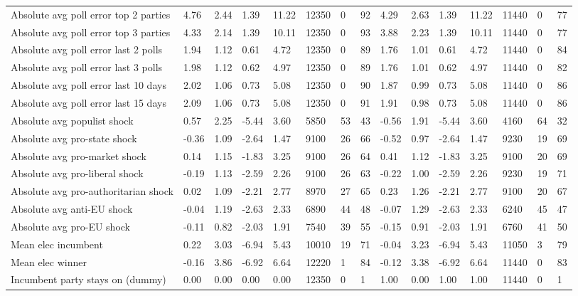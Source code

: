 \begin{longtable}{lllllllllllllll}
Absolute avg poll error top 2 parties & 4.76 & 2.44 & 1.39 & 11.22 & 12350 & 0 & 92 & 4.29 & 2.63 & 1.39 & 11.22 & 11440 & 0 & 77\\
Absolute avg poll error top 3 parties & 4.33 & 2.14 & 1.39 & 10.11 & 12350 & 0 & 93 & 3.88 & 2.23 & 1.39 & 10.11 & 11440 & 0 & 77\\
Absolute avg poll error last 2 polls & 1.94 & 1.12 & 0.61 & 4.72 & 12350 & 0 & 89 & 1.76 & 1.01 & 0.61 & 4.72 & 11440 & 0 & 84\\
\addlinespace
Absolute avg poll error last 3 polls & 1.98 & 1.12 & 0.62 & 4.97 & 12350 & 0 & 89 & 1.76 & 1.01 & 0.62 & 4.97 & 11440 & 0 & 82\\
Absolute avg poll error last 10 days & 2.02 & 1.06 & 0.73 & 5.08 & 12350 & 0 & 90 & 1.87 & 0.99 & 0.73 & 5.08 & 11440 & 0 & 86\\
Absolute avg poll error last 15 days & 2.09 & 1.06 & 0.73 & 5.08 & 12350 & 0 & 91 & 1.91 & 0.98 & 0.73 & 5.08 & 11440 & 0 & 86\\
Absolute avg populist shock & 0.57 & 2.25 & -5.44 & 3.60 & 5850 & 53 & 43 & -0.56 & 1.91 & -5.44 & 3.60 & 4160 & 64 & 32\\
Absolute avg pro-state shock & -0.36 & 1.09 & -2.64 & 1.47 & 9100 & 26 & 66 & -0.52 & 0.97 & -2.64 & 1.47 & 9230 & 19 & 69\\
\addlinespace
Absolute avg pro-market shock & 0.14 & 1.15 & -1.83 & 3.25 & 9100 & 26 & 64 & 0.41 & 1.12 & -1.83 & 3.25 & 9100 & 20 & 69\\
Absolute avg pro-liberal shock & -0.19 & 1.13 & -2.59 & 2.26 & 9100 & 26 & 63 & -0.22 & 1.00 & -2.59 & 2.26 & 9230 & 19 & 71\\
Absolute avg pro-authoritarian shock & 0.02 & 1.09 & -2.21 & 2.77 & 8970 & 27 & 65 & 0.23 & 1.26 & -2.21 & 2.77 & 9100 & 20 & 67\\
Absolute avg anti-EU shock & -0.04 & 1.19 & -2.63 & 2.33 & 6890 & 44 & 48 & -0.07 & 1.29 & -2.63 & 2.33 & 6240 & 45 & 47\\
Absolute avg pro-EU shock & -0.11 & 0.82 & -2.03 & 1.91 & 7540 & 39 & 55 & -0.15 & 0.91 & -2.03 & 1.91 & 6760 & 41 & 50\\
\addlinespace
Mean elec incumbent & 0.22 & 3.03 & -6.94 & 5.43 & 10010 & 19 & 71 & -0.04 & 3.23 & -6.94 & 5.43 & 11050 & 3 & 79\\
Mean elec winner & -0.16 & 3.86 & -6.92 & 6.64 & 12220 & 1 & 84 & -0.12 & 3.38 & -6.92 & 6.64 & 11440 & 0 & 83\\
Incumbent party stays on (dummy) & 0.00 & 0.00 & 0.00 & 0.00 & 12350 & 0 & 1 & 1.00 & 0.00 & 1.00 & 1.00 & 11440 & 0 & 1\\

\end{longtable}
